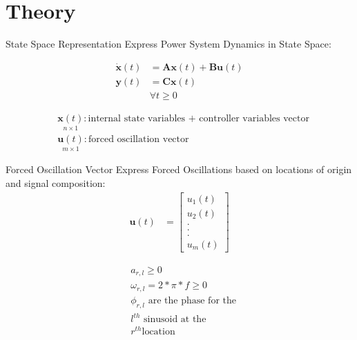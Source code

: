 \section[Theory]{Theory}
\label{sec:lasso_theory}

\begin{frame}[fragile]{State Space Representation}
	Express Power System Dynamics in State Space:

	\begin{align*}
		\dot{\textbf{x}}(t) &= 
		\textbf{A}\textbf{x}(t)
		+ \textbf{B}\textbf{u}(t)\\
		\textbf{y}(t) &= 
		\textbf{C}\textbf{x}(t)\\  
		& \forall t\geq0	
	\end{align*}
	
	\begin{align*}
		& \underset{\scriptscriptstyle n\times 1}{\textbf{x}(t)} : \text{internal state variables + controller variables vector}                                                                      \\
		& \underset{\scriptscriptstyle m\times 1}{\textbf{u}(t)} : \text{forced oscillation vector}
	\end{align*}
\end{frame}

\begin{frame}[fragile]{Forced Oscillation Vector}
	Express Forced Oscillations based on locations of origin and signal composition:
	\begin{align*}
		\textbf{u}(t) &= 
		\begin{bmatrix}
			u_1(t) \\
			u_2(t) \\
			. \\
			. \\
			. \\
			u_m(t)
		\end{bmatrix}		
	\end{align*}
	
	\begin{align*}
		& a_{r,l} \geq0 \\
		& \omega_{r,l} = 2*\pi*f \geq 0 \\
		& \phi_{r,l} \text{ are the phase for the} \\
		& l^{th} \text{ sinusoid at the} \\
		& r^{th} \text{location}
	\end{align*}

\end{frame}